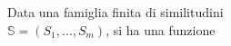 \documentclass[preview]{standalone}
\begin{document}
\begin{center}
\centering Data una famiglia finita di similitudini\\$\mathbb{S}=(S_1, \ldots, S_m)$, si ha una funzione
\end{center}
\end{document}
